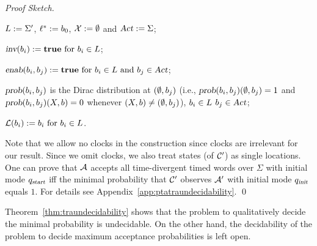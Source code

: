 \begin{proof}[Proof Sketch]
\begin{compactitem}
    \item $L      :=  \Sigma'$, $\ell^*     :=  b_{0} $, $\mathcal{X}    :=  \emptyset $ and $\mbox{\sl Act}      :=  \Sigma $;
    \item $\mbox{\sl inv}(b_{i})              :=  \mathbf{true}
                                            \text{ for }
                                            b_{i} \in L$;
    \item $\mbox{\sl enab}(b_{i},b_{j})   :=  \mathbf{true}
                                            \text{ for }
                                            b_{i} \in L
                                            \text{ and }
                                            b_{j} \in \mbox{\sl Act}$;
    \item $\mbox{\sl prob}(b_{i},b_{j})$ is the Dirac distribution at $(\emptyset,b_{j})$ (i.e., $\mbox{\sl prob}(b_{i},b_{j})(\emptyset,b_{j})=1$ and $\mbox{\sl prob}(b_{i},b_{j})(X,b)=0$ whenever $(X,b)\ne(\emptyset,b_{j})$),
                                            $b_{i} \in L$
                                            $b_{j} \in \mbox{\sl Act}$;
    \item $\mathcal{L}(b_{i})           :=  b_{i}
                                            \text{ for } b_{i} \in L$.
\end{compactitem}
Note that we allow no clocks in the construction since clocks are irrelevant for our result.
Since we omit clocks, we also treat states (of $\mathcal{C}'$) as single locations.
One can prove that $\mathcal{A}$ accepts all time-divergent timed words over $\Sigma$ with initial mode $q_{\mbox{\sl\scriptsize start}}$ iff
the minimal probability that $\mathcal{C}'$ observes $\mathcal{A}'$ with initial mode $q_{\mbox{\sl\scriptsize init} }$ equals $1$.
For details see Appendix~\ref{app:ptatraundecidability}. \qed
\end{proof}

\begin{remark}
Theorem~\ref{thm:traundecidability} shows that the problem to qualitatively decide the minimal probability is undecidable.
On the other hand, the decidability of the problem to decide maximum acceptance probabilities is left open.
\end{remark}
